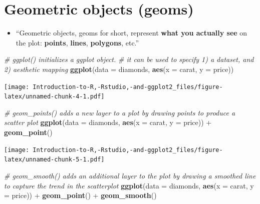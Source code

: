 \documentclass[]{book}
\newenvironment{Shaded}{\begin{snugshade}}{\end{snugshade}}
\newcommand{\KeywordTok}[1]{\textcolor[rgb]{0.13,0.29,0.53}{\textbf{{#1}}}}
\newcommand{\DataTypeTok}[1]{\textcolor[rgb]{0.13,0.29,0.53}{{#1}}}
\newcommand{\StringTok}[1]{\textcolor[rgb]{0.31,0.60,0.02}{{#1}}}
\newcommand{\CommentTok}[1]{\textcolor[rgb]{0.56,0.35,0.01}{\textit{{#1}}}}
\newcommand{\NormalTok}[1]{{#1}}
\providecommand{\tightlist}{%
  \setlength{\itemsep}{0pt}\setlength{\parskip}{0pt}}
\begin{document}
\section{\texorpdfstring{Geometric objects
(\textbf{geoms})}{Geometric objects (geoms)}}\label{geometric-objects-geoms}

\begin{itemize}
\tightlist
\item
  ``Geometric objects, geoms for short, represent \textbf{what you
  actually see} on the plot: \textbf{points}, \textbf{lines},
  \textbf{polygons}, etc.'' \citep{ggplot2}
\end{itemize}

\begin{Shaded}
\begin{Highlighting}[]
\CommentTok{# ggplot() initializes a ggplot object.}
\CommentTok{# it can be used to specify 1) a dataset, and 2) aesthetic mapping}
\KeywordTok{ggplot}\NormalTok{(}\DataTypeTok{data =} \NormalTok{diamonds, }\KeywordTok{aes}\NormalTok{(}\DataTypeTok{x =} \NormalTok{carat, }\DataTypeTok{y =} \NormalTok{price))}
\end{Highlighting}
\end{Shaded}

\texttt{[image: Introduction-to-R,-Rstudio,-and-ggplot2\_files/figure-latex/unnamed-chunk-4-1.pdf]}

\begin{Shaded}
\begin{Highlighting}[]
\CommentTok{# geom_points() adds a new layer to a plot by drawing points to produce a scatter plot }
\KeywordTok{ggplot}\NormalTok{(}\DataTypeTok{data =} \NormalTok{diamonds, }\KeywordTok{aes}\NormalTok{(}\DataTypeTok{x =} \NormalTok{carat, }\DataTypeTok{y =} \NormalTok{price)) +}\StringTok{ }\KeywordTok{geom_point}\NormalTok{()}
\end{Highlighting}
\end{Shaded}

\texttt{[image: Introduction-to-R,-Rstudio,-and-ggplot2\_files/figure-latex/unnamed-chunk-5-1.pdf]}

\begin{Shaded}
\begin{Highlighting}[]
\CommentTok{# geom_smooth() adds an additional layer to the plot by drawing a smoothed line to capture the trend in the scatterplot}
\KeywordTok{ggplot}\NormalTok{(}\DataTypeTok{data =} \NormalTok{diamonds, }\KeywordTok{aes}\NormalTok{(}\DataTypeTok{x =} \NormalTok{carat, }\DataTypeTok{y =} \NormalTok{price)) +}\StringTok{ }\KeywordTok{geom_point}\NormalTok{() +}\StringTok{ }\KeywordTok{geom_smooth}\NormalTok{()}
\end{Highlighting}
\end{Shaded}
\end{document}
